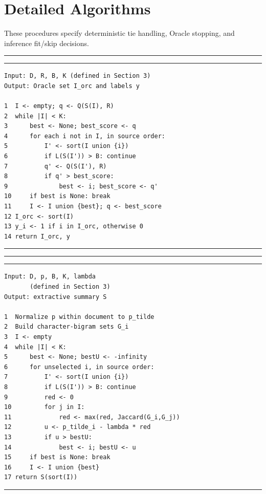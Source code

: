 \documentclass[10pt,twocolumn,letterpaper]{article}
\begin{document}
\par\medskip\noindent\begin{minipage}{\columnwidth}
\section{Detailed Algorithms}\label{appendix-a-detailed-algorithms}

These procedures specify deterministic tie handling, Oracle stopping, and inference fit/skip decisions.


\hrule
{}
\hrule
\begin{lstlisting}
Input: D, R, B, K (defined in Section 3)
Output: Oracle set I_orc and labels y

1  I <- empty; q <- Q(S(I), R)
2  while |I| < K:
3      best <- None; best_score <- q
4      for each i not in I, in source order:
5          I' <- sort(I union {i})
6          if L(S(I')) > B: continue
7          q' <- Q(S(I'), R)
8          if q' > best_score:
9              best <- i; best_score <- q'
10     if best is None: break
11     I <- I union {best}; q <- best_score
12 I_orc <- sort(I)
13 y_i <- 1 if i in I_orc, otherwise 0
14 return I_orc, y
\end{lstlisting}
\hrule


\end{minipage}\par\smallskip

\par\medskip\noindent\begin{minipage}{\columnwidth}
\hrule
{}
\hrule
\begin{lstlisting}
Input: D, p, B, K, lambda
       (defined in Section 3)
Output: extractive summary S

1  Normalize p within document to p_tilde
2  Build character-bigram sets G_i
3  I <- empty
4  while |I| < K:
5      best <- None; bestU <- -infinity
6      for unselected i, in source order:
7          I' <- sort(I union {i})
8          if L(S(I')) > B: continue
9          red <- 0
10         for j in I:
11             red <- max(red, Jaccard(G_i,G_j))
12         u <- p_tilde_i - lambda * red
13         if u > bestU:
14             best <- i; bestU <- u
15     if best is None: break
16     I <- I union {best}
17 return S(sort(I))
\end{lstlisting}
\hrule
\end{minipage}\par\smallskip
\end{document}
